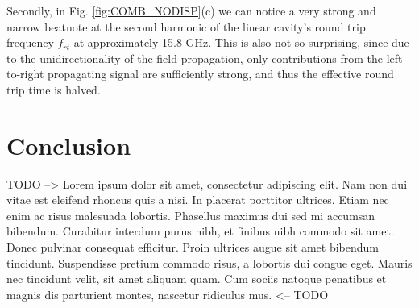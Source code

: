 \documentclass[journal]{IEEEtran}
\begin{document}
	
	Secondly, in Fig. \ref{fig:COMB_NODISP}(c) we can notice a very strong and narrow beatnote at the second harmonic of the linear cavity's round trip frequency $f_{rt}$ at approximately 15.8 GHz. This is also not so surprising, since due to the unidirectionality of the field propagation, only contributions from the left-to-right propagating signal are sufficiently strong, and thus the effective round trip time is halved.  
	\section{Conclusion}
	TODO --> Lorem ipsum dolor sit amet, consectetur adipiscing elit. Nam non dui vitae est eleifend rhoncus quis a nisi. In placerat porttitor ultrices. Etiam nec enim ac risus malesuada lobortis. Phasellus maximus dui sed mi accumsan bibendum. Curabitur interdum purus nibh, et finibus nibh commodo sit amet. Donec pulvinar consequat efficitur. Proin ultrices augue sit amet bibendum tincidunt. Suspendisse pretium commodo risus, a lobortis dui congue eget. Mauris nec tincidunt velit, sit amet aliquam quam. Cum sociis natoque penatibus et magnis dis parturient montes, nascetur ridiculus mus. <-- TODO
	
	
	
\end{document}
